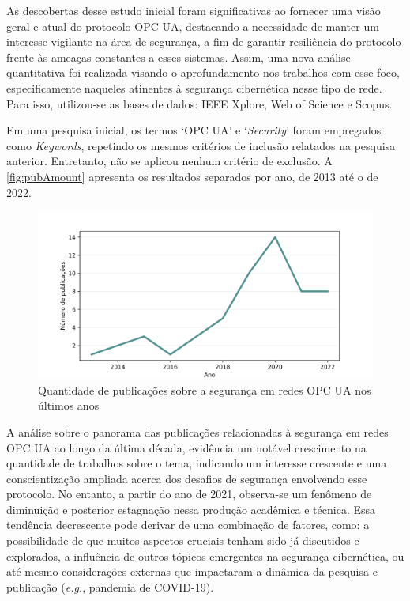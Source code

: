     As descobertas desse estudo inicial foram significativas ao fornecer uma visão geral e atual do protocolo OPC UA, destacando a necessidade de manter um interesse vigilante na área de segurança, a fim de garantir resiliência do protocolo frente às ameaças constantes a esses sistemas. Assim, uma nova análise quantitativa foi realizada visando o aprofundamento nos trabalhos com esse foco, especificamente naqueles atinentes à segurança cibernética nesse tipo de rede. Para isso, utilizou-se as bases de dados: IEEE Xplore, Web of Science e Scopus.

    Em uma pesquisa inicial, os termos `OPC UA' e `\textit{Security}' foram empregados como \textit{Keywords}, repetindo os mesmos critérios de inclusão relatados na pesquisa anterior. Entretanto, não se aplicou nenhum critério de exclusão. A \autoref{fig:pubAmount} apresenta os resultados separados por ano, de 2013 até o de 2022.

    \begin{figure}[htbp]
        \caption{Quantidade de publicações sobre a segurança em redes OPC UA nos últimos anos}
        \label{fig:pubAmount}
        \begin{center}
            \includegraphics[width=0.7\linewidth]{USPSC-img/pubAmount1.png}
        \end{center}
    \end{figure}

    A análise sobre o panorama das publicações relacionadas à segurança em redes OPC UA ao longo da última década, evidência um notável crescimento na quantidade de trabalhos sobre o tema, indicando um interesse crescente e uma conscientização ampliada acerca dos desafios de segurança envolvendo esse protocolo. No entanto, a partir do ano de 2021, observa-se um fenômeno de diminuição e posterior estagnação nessa produção acadêmica e técnica. Essa tendência decrescente pode derivar de uma combinação de fatores, como: a possibilidade de que muitos aspectos cruciais tenham sido já discutidos e explorados, a influência de outros tópicos emergentes na segurança cibernética, ou até mesmo considerações externas que impactaram a dinâmica da pesquisa e publicação (\textit{e.g.}, pandemia de COVID-19).

